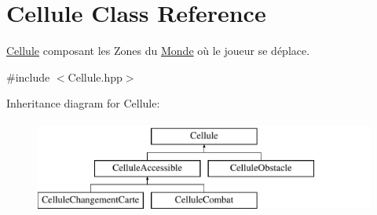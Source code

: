 \hypertarget{classCellule}{\section{Cellule Class Reference}
\label{classCellule}
}


\hyperlink{classCellule}{Cellule} composant les Zones du \hyperlink{classMonde}{Monde} où le joueur se déplace.  




{\ttfamily \#include $<$Cellule.\-hpp$>$}

Inheritance diagram for Cellule\-:\begin{figure}[H]
\begin{center}
\leavevmode
\includegraphics[height=3.000000cm]{classCellule}
\end{center}
\end{figure}
